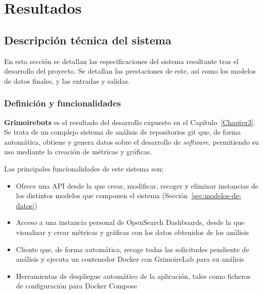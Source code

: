 
\chapter{Resultados} %

\label{Chapter4} %


\section{Descripción técnica del sistema}

En esta sección se detallan las especificaciones del sistema resultante tras el desarrollo del proyecto. Se detallan las prestaciones de este, así como los modelos de datos finales, y las entradas y salidas.

\subsection{Definición y funcionalidades}

\textbf{Grimoirebots} es el resultado del desarrollo expuesto en el Capítulo~{\ref{Chapter3}}. Se trata de un complejo sistema de análisis de repositorios git que, de forma automática, obtiene y genera datos sobre el desarrollo de \emph{software}, permitiendo su uso mediante la creación de métricas y gráficas.

Las principales funcionalidades de este sistema son:

\begin{itemize}
    \item Ofrece una API desde la que crear, modificar, recoger y eliminar instancias de los distintos modelos que componen el sistema (Sección~{\ref{sec:modelos-de-datos}})
    \item Acceso a una instancia personal de OpenSearch Dashboards, desde la que visualizar y crear métricas y gráficas con los datos obtenidos de los análisis
    \item Cliente que, de forma automática, recoge todas las solicitudes pendiente de análisis y ejecuta un contenedor Docker con GrimoireLab para su análisis
    \item Herramientas de despliegue automático de la aplicación, tales como ficheros de configuración para Docker Compose
\end{itemize}

